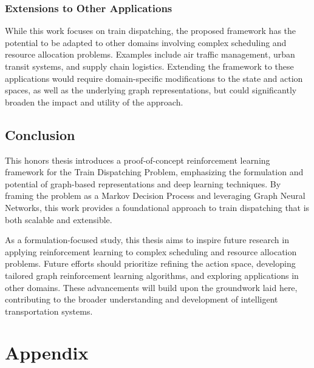 \documentclass[runningheads]{llncs}
\begin{document}
\subsubsection{Extensions to Other Applications}
While this work focuses on train dispatching, the proposed framework has the potential to be adapted to other domains involving complex scheduling and resource allocation problems. 
Examples include air traffic management, urban transit systems, and supply chain logistics. 
Extending the framework to these applications would require domain-specific modifications to the state and action spaces, as well as the underlying graph representations, but could significantly broaden the impact and utility of the approach.

\subsection{Conclusion}
\label{sss:conclusion}

This honors thesis introduces a proof-of-concept reinforcement learning framework for the Train Dispatching Problem, emphasizing the formulation and potential of graph-based representations and deep learning techniques. 
By framing the problem as a Markov Decision Process and leveraging Graph Neural Networks, this work provides a foundational approach to train dispatching that is both scalable and extensible.

As a formulation-focused study, this thesis aims to inspire future research in applying reinforcement learning to complex scheduling and resource allocation problems. 
Future efforts should prioritize refining the action space, developing tailored graph reinforcement learning algorithms, and exploring applications in other domains. 
These advancements will build upon the groundwork laid here, contributing to the broader understanding and development of intelligent transportation systems.



\section{Appendix}
\end{document}
